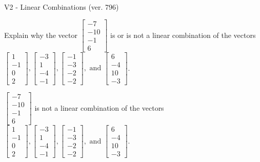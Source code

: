 \begin{exercise}
  \begin{exerciseTitle}V2 - Linear Combinations (ver. 796)\end{exerciseTitle}
  \begin{exerciseStatement}
    Explain why the vector \(\left[\begin{array}{c}
-7 \\
-10 \\
-1 \\
6
\end{array}\right]\)  is or is not a linear 
	combination of the vectors \(\left[\begin{array}{c}
1 \\
-1 \\
0 \\
2
\end{array}\right] , \left[\begin{array}{c}
-3 \\
1 \\
-4 \\
-1
\end{array}\right] , \left[\begin{array}{c}
-1 \\
-3 \\
-2 \\
-2
\end{array}\right] , \text{ and } \left[\begin{array}{c}
6 \\
-4 \\
10 \\
-3
\end{array}\right]\).
	


  \end{exerciseStatement}
  \begin{exerciseAnswer}
   \(\left[\begin{array}{c}
-7 \\
-10 \\
-1 \\
6
\end{array}\right]\) 
  	 is not  
	a linear combination of the vectors \(\left[\begin{array}{c}
1 \\
-1 \\
0 \\
2
\end{array}\right] , \left[\begin{array}{c}
-3 \\
1 \\
-4 \\
-1
\end{array}\right] , \left[\begin{array}{c}
-1 \\
-3 \\
-2 \\
-2
\end{array}\right] , \text{ and } \left[\begin{array}{c}
6 \\
-4 \\
10 \\
-3
\end{array}\right]\).


\end{exerciseAnswer}
\end{exercise}
